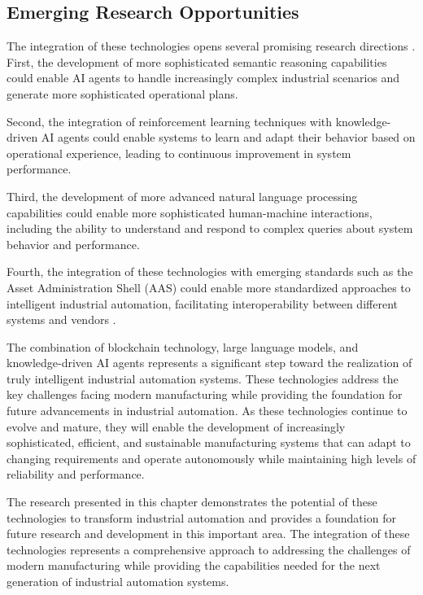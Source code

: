 \subsection{Emerging Research Opportunities}

The integration of these technologies opens several promising research directions \cite{wicaksono2024artificial}. First, the development of more sophisticated semantic reasoning capabilities could enable AI agents to handle increasingly complex industrial scenarios and generate more sophisticated operational plans.

Second, the integration of reinforcement learning techniques with knowledge-driven AI agents could enable systems to learn and adapt their behavior based on operational experience, leading to continuous improvement in system performance.

Third, the development of more advanced natural language processing capabilities could enable more sophisticated human-machine interactions, including the ability to understand and respond to complex queries about system behavior and performance.

Fourth, the integration of these technologies with emerging standards such as the Asset Administration Shell (AAS) could enable more standardized approaches to intelligent industrial automation, facilitating interoperability between different systems and vendors \cite{hosseini2025leveraging}.

The combination of blockchain technology, large language models, and knowledge-driven AI agents represents a significant step toward the realization of truly intelligent industrial automation systems. These technologies address the key challenges facing modern manufacturing while providing the foundation for future advancements in industrial automation. As these technologies continue to evolve and mature, they will enable the development of increasingly sophisticated, efficient, and sustainable manufacturing systems that can adapt to changing requirements and operate autonomously while maintaining high levels of reliability and performance.

The research presented in this chapter demonstrates the potential of these technologies to transform industrial automation and provides a foundation for future research and development in this important area. The integration of these technologies represents a comprehensive approach to addressing the challenges of modern manufacturing while providing the capabilities needed for the next generation of industrial automation systems.
